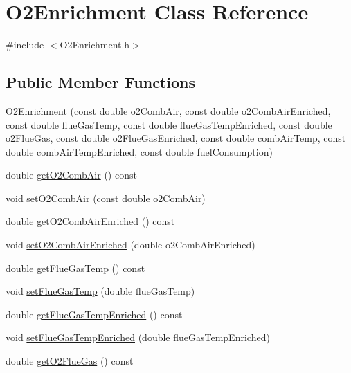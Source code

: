 \hypertarget{class_o2_enrichment}{}\section{O2\+Enrichment Class Reference}
\label{class_o2_enrichment}


{\ttfamily \#include $<$O2\+Enrichment.\+h$>$}

\subsection*{Public Member Functions}
\begin{DoxyCompactItemize}
\item 
\hyperlink{class_o2_enrichment_a8d60cf5ef65e8528a5a432c7cec75699}{O2\+Enrichment} (const double o2\+Comb\+Air, const double o2\+Comb\+Air\+Enriched, const double flue\+Gas\+Temp, const double flue\+Gas\+Temp\+Enriched, const double o2\+Flue\+Gas, const double o2\+Flue\+Gas\+Enriched, const double comb\+Air\+Temp, const double comb\+Air\+Temp\+Enriched, const double fuel\+Consumption)
\item 
double \hyperlink{class_o2_enrichment_a52953d4a55fd9e4d91030fe96d800f71}{get\+O2\+Comb\+Air} () const
\item 
void \hyperlink{class_o2_enrichment_a4ed21239c9e2ed2b193c94e9df0a9079}{set\+O2\+Comb\+Air} (const double o2\+Comb\+Air)
\item 
double \hyperlink{class_o2_enrichment_a0e9a9ec7987eaa673cb9527b293ded7c}{get\+O2\+Comb\+Air\+Enriched} () const
\item 
void \hyperlink{class_o2_enrichment_af781223d8201c4e5a1d0085718b0b36c}{set\+O2\+Comb\+Air\+Enriched} (double o2\+Comb\+Air\+Enriched)
\item 
double \hyperlink{class_o2_enrichment_a53083756c50aaf89f755a132b62e999b}{get\+Flue\+Gas\+Temp} () const
\item 
void \hyperlink{class_o2_enrichment_a37e625de13b171a6db256a108455aab9}{set\+Flue\+Gas\+Temp} (double flue\+Gas\+Temp)
\item 
double \hyperlink{class_o2_enrichment_ab69ee84a1b662e4c1f9a49d23acc6f00}{get\+Flue\+Gas\+Temp\+Enriched} () const
\item 
void \hyperlink{class_o2_enrichment_a787af9e47a73f2416d6c5d23aaf6d659}{set\+Flue\+Gas\+Temp\+Enriched} (double flue\+Gas\+Temp\+Enriched)
\item 
double \hyperlink{class_o2_enrichment_a1d31e1aef5f5a92f38c9a07216d0e539}{get\+O2\+Flue\+Gas} () const
\item 

\end{DoxyCompactItemize}
